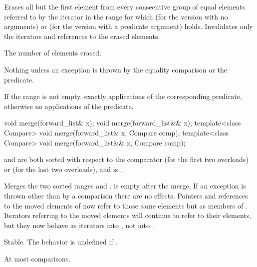\begin{itemdescr}
\pnum
\effects Erases all but the first element from every consecutive
group of equal elements referred to by the iterator  in the range  for which  (for the version with no arguments) or  (for the version with a predicate argument) holds.
Invalidates only the iterators and references to the erased elements.

\pnum
\returns The number of elements erased.

\pnum
\throws Nothing unless an exception is thrown by the equality comparison or the predicate.

\pnum
\complexity If the range  is not empty, exactly  applications of the corresponding predicate, otherwise no applications of the predicate.
\end{itemdescr}

%
\begin{itemdecl}
void merge(forward_list& x);
void merge(forward_list&& x);
template<class Compare> void merge(forward_list& x, Compare comp);
template<class Compare> void merge(forward_list&& x, Compare comp);
\end{itemdecl}

\begin{itemdescr}
\pnum
\requires {} and  are both sorted with respect to
the comparator  (for the first two overloads) or
 (for the last two overloads), and
 is .

\pnum
\effects Merges the two sorted ranges \tcode{[begin(), end())} and
\tcode{[x.begin(), x.end())}.  is empty after the merge. If an
exception is thrown other than by a comparison there are no effects.
Pointers and references to the moved elements of  now refer to those same elements
but as members of . Iterators referring to the moved elements will continue to
refer to their elements, but they now behave as iterators into , not into
.

\pnum
\remarks Stable. The behavior is undefined if
.

\pnum
\complexity At most  comparisons.
\end{itemdescr}

